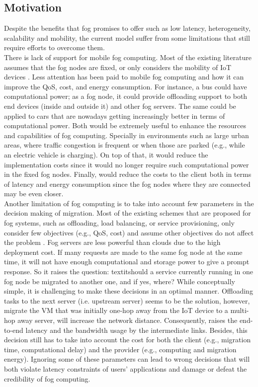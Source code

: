 \subsection{Motivation}\label{subsec:Motivation}
\noindent\tab Despite the benefits that fog promises to offer such as low latency, heterogeneity, scalability and mobility, the current model suffer from some limitations that still require efforts to overcome them.\\
\noindent\tab There is lack of support for mobile fog computing. Most of the existing literature assumes that the fog nodes are fixed, or only considers the mobility of IoT devices \cite{yousefpour2018all}. Less attention has been paid to mobile fog computing and how it can improve the QoS, cost, and energy consumption. For instance, a bus could have computational power; as a fog node, it could provide offloading support to both end devices (inside and outside it) and other fog servers. The same could be applied to cars that are nowadays getting increasingly better in terms of computational power. Both would be extremely useful to enhance the resources and capabilities of fog computing. Specially in environments such as large urban areas, where traffic congestion is frequent or when those are parked (e.g., while an electric vehicle is charging). On top of that, it would reduce the implementation costs since it would no longer require such computational power in the fixed fog nodes. Finally, would reduce the costs to the client both in terms of latency and energy consumption since the fog nodes where they are connected may be even closer.\\
\noindent\tab Another limitation of fog computing is to take into account few parameters in the decision making of migration. Most of the existing schemes that are proposed for fog systems, such as offloading, load balancing, or service provisioning, only consider few objectives (e.g., QoS, cost) and assume other objectives do not affect the problem \cite{yousefpour2018all}. Fog servers are less powerful than clouds due to the high deployment cost. If many requests are made to the same fog node at the same time, it will not have enough computational and storage power to give a prompt response. So it raises the question: textit{should a service currently running in one fog node be migrated to another one, and if yes, where?} While conceptually simple, it is challenging to make these decisions in an optimal manner. Offloading tasks to the next server (i.e. upstream server) seems to be the solution, however, migrate the VM that was initially one-hop away from the IoT device to a multi-hop away server, will increase the network distance. Consequently, raises the end-to-end latency and the bandwidth usage by the intermediate links. Besides, this decision still has to take into account the cost for both the client (e.g., migration time, computational delay) and the provider (e.g., computing and migration energy). Ignoring some of these parameters can lead to wrong decisions that will both violate latency constraints of users' applications and damage or defeat the credibility of fog computing.
